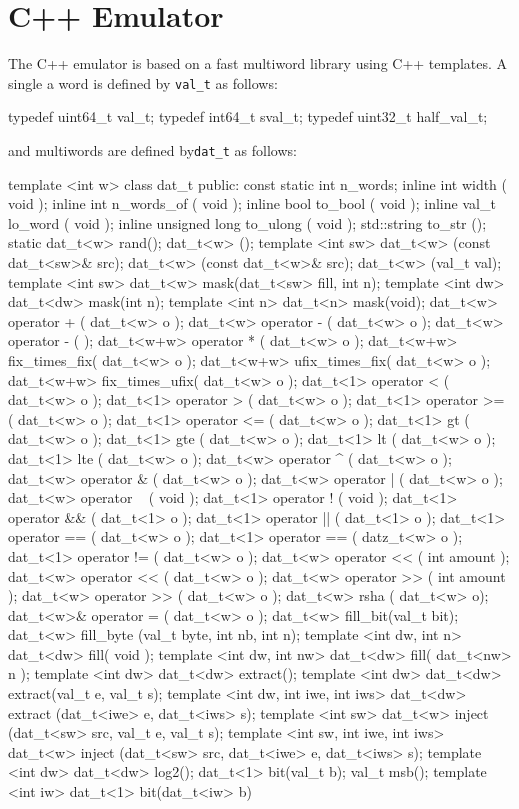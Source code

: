 \documentclass[10pt,twocolumn]{article}
\def\code#1{{\small\tt #1}}
\begin{document}
\section{C++ Emulator}

The C++ emulator is based on a fast multiword library using
C++ templates.  A single a
word is defined by \code{val\_t} as follows: 

\begin{cpp}
typedef uint64_t val_t;
typedef int64_t sval_t; 
typedef uint32_t half_val_t;
\end{cpp}

\noindent
and multiwords are defined by\code{dat\_t} as follows:

\begin{cpp}
template <int w>
class dat_t {
 public:
  const static int n_words;
  inline int width ( void );
  inline int n_words_of ( void );
  inline bool to_bool ( void );
  inline val_t lo_word ( void );
  inline unsigned long to_ulong ( void );
  std::string to_str ();
  static dat_t<w> rand();
  dat_t<w> ();
template <int sw> 
  dat_t<w> (const dat_t<sw>& src);
  dat_t<w> (const dat_t<w>& src);
  dat_t<w> (val_t val);
template <int sw> 
  dat_t<w> mask(dat_t<sw> fill, int n);
template <int dw> 
  dat_t<dw> mask(int n);
template <int n> 
  dat_t<n> mask(void);
  dat_t<w> operator + ( dat_t<w> o );
  dat_t<w> operator - ( dat_t<w> o );
  dat_t<w> operator - ( );
  dat_t<w+w> operator * ( dat_t<w> o );
  dat_t<w+w> fix_times_fix( dat_t<w> o );
  dat_t<w+w> ufix_times_fix( dat_t<w> o );
  dat_t<w+w> fix_times_ufix( dat_t<w> o );
  dat_t<1> operator < ( dat_t<w> o );
  dat_t<1> operator > ( dat_t<w> o );
  dat_t<1> operator >= ( dat_t<w> o );
  dat_t<1> operator <= ( dat_t<w> o );
  dat_t<1> gt ( dat_t<w> o );
  dat_t<1> gte ( dat_t<w> o );
  dat_t<1> lt ( dat_t<w> o );
  dat_t<1> lte ( dat_t<w> o );
  dat_t<w> operator ^ ( dat_t<w> o );
  dat_t<w> operator & ( dat_t<w> o );
  dat_t<w> operator | ( dat_t<w> o );
  dat_t<w> operator ~ ( void );
  dat_t<1> operator ! ( void );
  dat_t<1> operator && ( dat_t<1> o );
  dat_t<1> operator || ( dat_t<1> o );
  dat_t<1> operator == ( dat_t<w> o );
  dat_t<1> operator == ( datz_t<w> o );
  dat_t<1> operator != ( dat_t<w> o );
  dat_t<w> operator << ( int amount );
  dat_t<w> operator << ( dat_t<w> o );
  dat_t<w> operator >> ( int amount );
  dat_t<w> operator >> ( dat_t<w> o );
  dat_t<w> rsha ( dat_t<w> o);
  dat_t<w>& operator = ( dat_t<w> o );
  dat_t<w> fill_bit(val_t bit);
  dat_t<w> fill_byte
    (val_t byte, int nb, int n);
template <int dw, int n> 
  dat_t<dw> fill( void );
template <int dw, int nw> 
  dat_t<dw> fill( dat_t<nw> n );
template <int dw> 
  dat_t<dw> extract();
template <int dw> 
  dat_t<dw> extract(val_t e, val_t s);
template <int dw, int iwe, int iws> 
  dat_t<dw> extract
    (dat_t<iwe> e, dat_t<iws> s);
template <int sw> 
  dat_t<w> inject
    (dat_t<sw> src, val_t e, val_t s);
template <int sw, int iwe, int iws> 
  dat_t<w> inject
    (dat_t<sw> src, 
     dat_t<iwe> e, dat_t<iws> s);
template <int dw> 
  dat_t<dw> log2();
  dat_t<1> bit(val_t b);
  val_t msb();
template <int iw>
  dat_t<1> bit(dat_t<iw> b)
}
\end{cpp}
\end{document}
